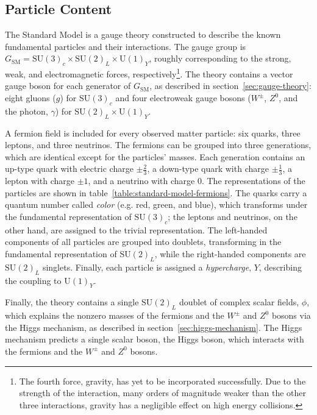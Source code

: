 \subsection{Particle Content}
The Standard Model is a gauge theory constructed to describe the known fundamental particles and their interactions. The gauge group is $G_{\mathrm{SM}}=\mathrm{SU}(3)_c\times \mathrm{SU}(2)_L \times \mathrm{U}(1)_Y$, roughly corresponding to the strong, weak, and electromagnetic forces, respectively\footnote{The fourth force, gravity, has yet to be incorporated successfully. Due to the strength of the interaction, many orders of magnitude weaker than the other three interactions, gravity has a negligible effect on high energy collisions.}. The theory contains a vector gauge boson for each generator of $G_{\mathrm{SM}}$, as described in section~\ref{sec:gauge-theory}: eight gluons ($g$) for $\mathrm{\mathrm{SU}}(3)_c$ and four electroweak gauge bosons ($W^{\pm}$, $Z^0$, and the photon, $\gamma$) for $\mathrm{SU}(2)_L\times \mathrm{U}(1)_Y$. 

A fermion field is included for every observed matter particle: six quarks, three leptons, and three neutrinos. The fermions can be grouped into three generations, which are identical except for the particles' masses. Each generation contains an up-type quark with electric charge $\pm\frac23$, a down-type quark with charge $\pm\frac13$, a lepton with charge $\pm1$, and a neutrino with charge $0$. The representations of the particles are shown in table~\ref{table:standard-model-fermions}. The quarks carry a quantum number called \emph{color} (e.g. red, green, and blue), which transforms under the fundamental representation of $\mathrm{SU}(3)_c$; the leptons and neutrinos, on the other hand, are assigned to the trivial representation. The left-handed components of all particles are grouped into doublets, transforming in the fundamental representation of $\mathrm{SU}(2)_L$, while the right-handed components are $\mathrm{SU}(2)_L$ singlets. Finally, each particle is assigned a \emph{hypercharge}, $Y$, describing the coupling to $\mathrm{U}(1)_Y$.

Finally, the theory contains a single $\mathrm{SU}(2)_L$ doublet of complex scalar fields, $\phi$, which explains the nonzero masses of the fermions and the $W^{\pm}$ and $Z^0$ bosons via the Higgs mechanism, as described in section~\ref{sec:higgs-mechanism}. The Higgs mechanism predicts a single scalar boson, the Higgs boson, which interacts with the fermions and the $W^{\pm}$ and $Z^0$ bosons. 

